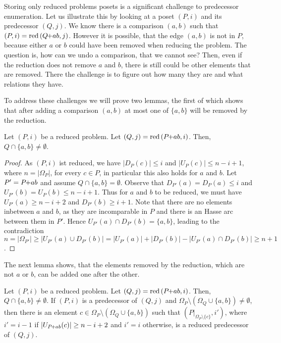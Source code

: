 \documentclass[twoside,leqno,twocolumn]{article}
\newcommand{\pchild}[3]{{#1}\kern-1pt{+}{#2}{#3}}
\newcommand{\reduced}[1]{\operatorname{red}{#1}}
\newcommand{\less}[2]{D_{#1}(#2)}
\newcommand{\greater}[2]{U_{#1}(#2)}
\begin{document}
Storing only reduced problems posets is a significant challenge to predecessor enumeration.
Let us illustrate this by looking at a poset $(P, i)$ and its predecessor $(Q, j)$.
We know there is a comparison $(a, b)$ such that $(P, i) = \reduced(\pchild{Q}{a}{b}, j)$.
However it is possible, that the edge $(a, b)$ is not in $P$, because either $a$ or $b$ could have been removed when reducing the problem.
The question is, how can we undo a comparison, that we cannot see?
Then, even if the reduction does not remove $a$ and $b$, there is still could be other elements that are removed.
There the challenge is to figure out how many they are and what relations they have.

To address these challenges we will prove two lemmas, the first of which shows that after adding a comparison $(a, b)$ at most one of $\{a, b\}$ will be removed by the reduction.

\begin{lemma} \label{lemma:remove_only_last_element_edge}
  Let $(P, i)$ be a reduced problem.
  Let $(Q, j) = \reduced{(\pchild{P}{a}{b}, i)}$.
  Then, $Q \cap \{a ,b \} \neq \emptyset$.
\end{lemma}

\begin{proof}
  As $(P, i)$ ist reduced, we have $|\less{P}{c}| \le i$ and $|\greater{P}{c}| \le n - i + 1$, where $n = |\Omega_P|$, for every $c \in P$, in particular this also holds for $a$ and $b$.
  Let $P' = \pchild{P}{a}{b}$ and assume $Q \cap \{a ,b \} = \emptyset$.
  Observe that $\less{P'}{a} = \less{P}{a} \le i$ and $\greater{P'}{b} = \greater{P}{b} \le n - i + 1$.
  Thus for $a$ and $b$ to be reduced, we must have $\greater{P'}{a} \ge n - i + 2$ and $\less{P'}{b} \ge i + 1$.
  Note that there are no elements inbetween $a$ and $b$, as they are incomparable in $P$ and there is an Hasse arc between them in $P'$.
  Hence $\greater{P'}{a} \cap \less{P'}{b} = \{a, b\}$, leading to the contradiction $n = |\Omega_{P'}| \ge |\greater{P'}{a} \cup \less{P'}{b}| = |\greater{P'}{a}| + |\less{P'}{b}| - |\greater{P'}{a} \cap \less{P'}{b}| \ge n + 1$.
\end{proof}

The next lemma shows, that the elements removed by the reduction, which are not $a$ or $b$, can be added one after the other.

\begin{lemma}\label{lemma:remove_elements_iteratively}
  Let $(P, i)$ be a reduced problem.
  Let $(Q, j) = \reduced{(\pchild{P}{a}{b}, i)}$.
  Then, $Q \cap \{a, b\} \neq \emptyset$.
  If $(P, i)$ is a predecessor of $(Q, j)$ and $\Omega_P \setminus (\Omega_Q \cup \{a, b\}) \neq \emptyset$, then there is an element $c \in \Omega_P \setminus (\Omega_Q \cup \{a, b\})$ such that $(P|_{\Omega_P \setminus \{c\}}, i')$, where $i' = i - 1$ if $|\greater{\pchild{P}{a}{b}}{c}| \ge n-i+2$ and $i'=i$ otherwise, is a reduced predecessor of $(Q, j)$.
\end{lemma}
\end{document}
